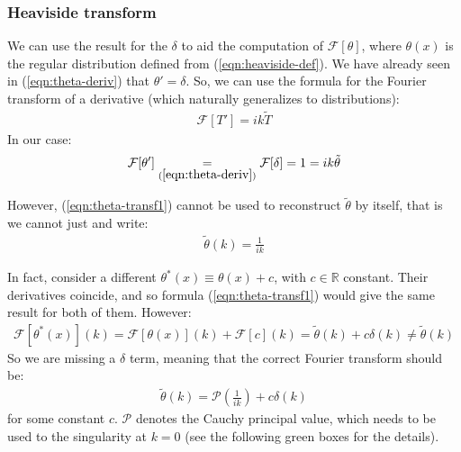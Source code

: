 \documentclass[../template.tex]{subfiles}
\begin{document}
\subsubsection{Heaviside transform}
We can use the result for the $\delta$ to aid the computation of $\mathcal{F}[\theta]$, where $\theta(x)$ is the regular distribution defined from (\ref{eqn:heaviside-def}). We have already seen in (\ref{eqn:theta-deriv}) that $\theta' = \delta$. So, we can use the formula for the Fourier transform of a derivative (which naturally generalizes to distributions):
\begin{align} \label{eqn:derivative-property}
    \mathcal{F}[T'] = ik \tilde{T}
\end{align}
In our case:
\begin{align} \label{eqn:theta-transf1}
    \mathcal{F}[\theta'] \underset{(\ref{eqn:theta-deriv})}{=}  \mathcal{F}[\delta] = 1 = ik \tilde{\theta}
\end{align}


However, (\ref{eqn:theta-transf1}) cannot be used to reconstruct $\tilde{\theta}$ by itself, that is we cannot just  and write:
\begin{align} \label{eqn:wrong-theta-transform}
    \tilde{\theta}(k) = \frac{1}{ik} 
\end{align}

In fact, consider a different $\theta^*(x) \equiv \theta(x) + c$, with $c \in \mathbb{R}$ constant. Their derivatives coincide, and so formula (\ref{eqn:theta-transf1}) would give the same result for both of them. However:
\begin{align*}
    \mathcal{F}[\theta^*(x)](k) = \mathcal{F}[\theta(x)](k) + \mathcal{F}[c](k) = \tilde{\theta}(k) + c \delta(k) \neq \tilde{\theta}(k)
\end{align*}
So we are missing a $\delta$ term, meaning that the correct Fourier transform should be:
\begin{align}\label{eqn:full-theta-tilda}
    \tilde{\theta}(k) = \mathcal{P}\left(\frac{1}{ik} \right) + c \delta(k)
\end{align}
for some constant $c$. $\mathcal{P}$ denotes the Cauchy principal value, which needs to be used to  the singularity at $k=0$ (see the following green boxes for the details).

\medskip
\end{document}
